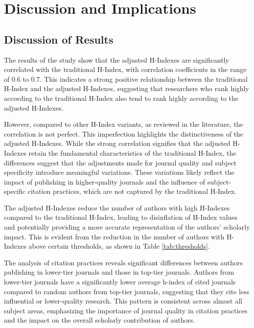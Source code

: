 \chapter{Discussion and Implications}
\label{ch:discussion}

\section{Discussion of Results}

The results of the study show that the adjusted H-Indexes are significantly
correlated with the traditional H-Index, with correlation coefficients in the
range of 0.6 to 0.7. This indicates a strong positive relationship between the
traditional H-Index and the adjusted H-Indexes, suggesting that researchers who
rank highly according to the traditional H-Index also tend to rank highly
according to the adjusted H-Indexes.

However, compared to other H-Index variants, as reviewed in the literature, the
correlation is not perfect. This imperfection highlights the distinctiveness of
the adjusted H-Indexes. While the strong correlation signifies that the
adjusted H-Indexes retain the fundamental characteristics of the traditional
H-Index, the differences suggest that the adjustments made for journal quality
and subject specificity introduce meaningful variations. These variations
likely reflect the impact of publishing in higher-quality journals and the
influence of subject-specific citation practices, which are not captured by the
traditional H-Index. %

The adjusted H-Indexes reduce the number of authors with high H-Indexes
compared to the traditional H-Index, leading to disinflation of H-Index values
and potentially providing a more accurate representation of the authors'
scholarly impact. This is evident from the reduction in the number of authors
with H-Indexes above certain thresholds, as shown in Table
\ref{tab:thresholds}.

The analysis of citation practices reveals significant differences between
authors publishing in lower-tier journals and those in top-tier journals.
Authors from lower-tier journals have a significantly lower average h-index of
cited journals compared to random authors from top-tier journals, suggesting
that they cite less influential or lower-quality research. This pattern is
consistent across almost all subject areas, emphasizing the importance of
journal quality in citation practices and the impact on the overall scholarly
contribution of authors.


